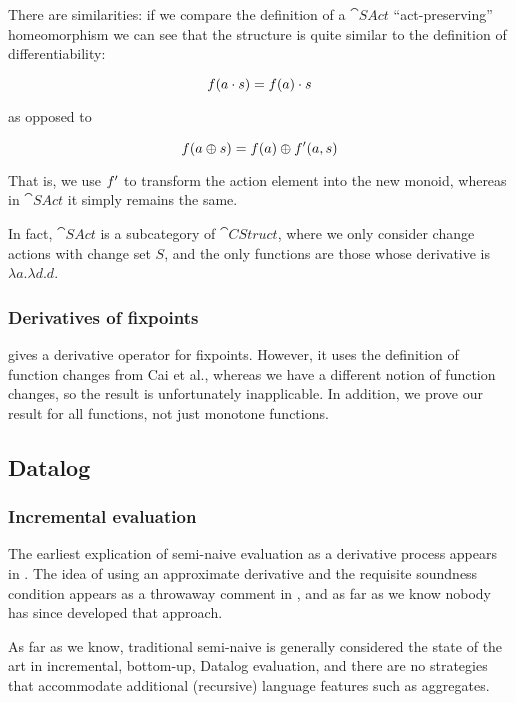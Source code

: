 There are similarities: if we compare the definition of a $\cat{SAct}$ ``act-preserving''
homeomorphism \autocite[See][]{kilp2000monoids} we can see that the structure is
quite similar to the definition of differentiability:

$$f(a \cdot s) = f(a) \cdot s$$

as opposed to

$$f(a \oplus s) = f(a) \oplus f'(a, s)$$

That is, we use $f'$ to transform the action element into the new
monoid, whereas in $\cat{SAct}$ it simply remains the same.

In fact, $\cat{SAct}$ is a subcategory of $\cat{CStruct}$, where we only
consider change actions with change set $S$, and the only functions are those
whose derivative is $\lambda a. \lambda d. d$.

\subsubsection{Derivatives of fixpoints}

\textcite{arntz2017fixpoints} gives a derivative operator for fixpoints. However,
it uses the definition of function changes from Cai et al., whereas
we have a different notion of function changes, so the result is unfortunately
inapplicable. In addition, we prove our result for all functions, not just
monotone functions.

\subsection{Datalog}

\subsubsection{Incremental evaluation}

The earliest explication of semi-naive evaluation as a derivative process
appears in \textcite{bancilhon1986naive}. The idea of using an approximate derivative
and the requisite soundness condition appears as a throwaway comment in
\textcite[][section 3.2.2]{bancilhon1986amateur}, and as far as we know nobody has since
developed that approach. 

As far as we know, traditional semi-naive is generally considered the state of
the art in incremental, bottom-up, Datalog evaluation, and there are no strategies that
accommodate additional (recursive) language features such as aggregates.

